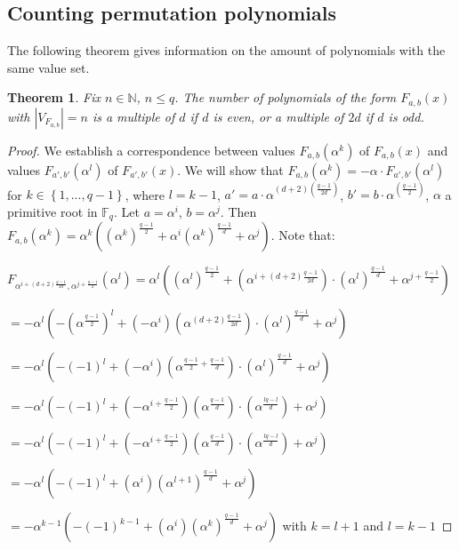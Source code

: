\documentclass{article}
\newtheorem{theorem}{Theorem}[section]
\theoremstyle{definition}
\theoremstyle{remark}
\numberwithin{equation}{section}
\begin{document}
\subsection{Counting permutation polynomials}

 The following theorem gives information on the amount of polynomials with the same value set.

    \begin{theorem}\label{el_teorema}
        Fix $n \in \mathbb{N}$, $n \leq q$. The number of polynomials of the form $F_{a,b}(x)$ with $\left\vert V_{F_{a,b}} \right\vert = n$ is a multiple of $d$ if $d$ is even, or a multiple of $2d$ if $d$ is odd.
    \end{theorem}

    \begin{proof}
      We establish a correspondence between values $F_{a,b}(\alpha^k)$ of $F_{a,b}(x)$ and values $F_{a',b'}(\alpha^l)$ of $F_{a',b'}(x)$. We will show that $F_{a,b}(\alpha^k) = -\alpha \cdot F_{a',b'}(\alpha^l)$ for $k \in \left\{1,...,q-1\right\}$, where $l=k-1$, $a' = a \cdot \alpha^{(d+2)(\frac{q-1}{2d})}$, $b' = b \cdot \alpha^{(\frac{q-1}{2})}$, $\alpha$ a primitive root in $\mathbb{F}_q$. Let $a = \alpha^i$, $b=\alpha^j$. Then $F_{a,b}(\alpha^k) = \alpha^{k}((\alpha^k)^{\frac{q-1}{2}} + \alpha^i (\alpha^k)^{\frac{q-1}{d}} + \alpha^j)$. Note that: 

      $F_{\alpha^{i+(d+2)\frac{q-1}{2d}},\alpha^{j+\frac{q-1}{2}}}(\alpha^{l}) = \alpha^l((\alpha^l)^{\frac{q-1}{2}}+(\alpha^{i+(d+2)\frac{q-1}{2d}})\cdot(\alpha^l)^{\frac{q-1}{d}}+\alpha^{j+\frac{q-1}{2}})$

      $= -\alpha^l(-(\alpha^{\frac{q-1}{2}})^l+(-\alpha^{i})(\alpha^{(d+2)\frac{q-1}{2d}})\cdot(\alpha^l)^{\frac{q-1}{d}}+\alpha^{j})$

      $= -\alpha^l(-(-1)^{l}+(-\alpha^{i})(\alpha^{\frac{q-1}{2}+\frac{q-1}{d}})\cdot(\alpha^l)^{\frac{q-1}{d}}+\alpha^{j})$

      $= -\alpha^l(-(-1)^{l}+(-\alpha^{i+\frac{q-1}{2}})(\alpha^{\frac{q-1}{d}})\cdot(\alpha^{\frac{lq-l}{d}})+\alpha^{j})$

      $= -\alpha^l(-(-1)^{l}+(-\alpha^{i+\frac{q-1}{2}})(\alpha^{\frac{q-1}{d}})\cdot(\alpha^{\frac{lq-l}{d}})+\alpha^{j})$

      $= -\alpha^l(-(-1)^{l}+(\alpha^{i})(\alpha^{l+1})^{\frac{q-1}{d}}+\alpha^{j})$

      $= -\alpha^{k-1}(-(-1)^{k-1}+(\alpha^{i})(\alpha^{k})^{\frac{q-1}{d}}+\alpha^{j})$ with $k=l+1$ and $l=k-1$


\end{proof}
\end{document}
